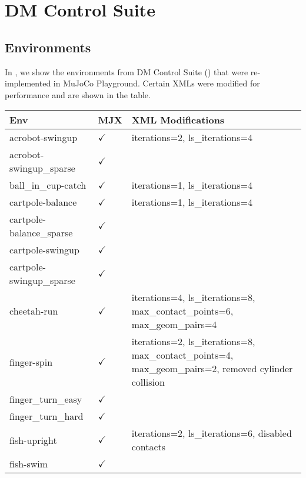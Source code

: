 \section{DM Control Suite}
\label{sec:appendix_dm_control}

\subsection{Environments}
\label{sec:appendix_dm_control_envs}

In , we show the environments from DM Control Suite (\cite{tassa2018deepmind}) that were re-implemented in MuJoCo Playground. Certain XMLs were modified for performance and are shown in the table. 

\begin{table*}[!ht]
\centering
\begin{tabular}{|l|p{1.2cm}|p{10cm}|} %
\hline
\textbf{Env} & \textbf{MJX} & \textbf{XML Modifications} \\ \hline
acrobot-swingup           & $\checkmark$ & iterations=2, ls\_iterations=4 \\ \hline
acrobot-swingup\_sparse    & $\checkmark$ &  \\ \hline
ball\_in\_cup-catch         & $\checkmark$ & iterations=1, ls\_iterations=4 \\ \hline
cartpole-balance          & $\checkmark$ & iterations=1, ls\_iterations=4 \\ \hline
cartpole-balance\_sparse   & $\checkmark$ &  \\ \hline
cartpole-swingup          & $\checkmark$ &  \\ \hline
cartpole-swingup\_sparse   & $\checkmark$ &  \\ \hline
cheetah-run               & $\checkmark$ & iterations=4, ls\_iterations=8, max\_contact\_points=6, max\_geom\_pairs=4 \\ \hline
finger-spin               & $\checkmark$ & iterations=2, ls\_iterations=8, max\_contact\_points=4, max\_geom\_pairs=2, removed cylinder collision \\ \hline
finger\_turn\_easy          & $\checkmark$ &  \\ \hline
finger\_turn\_hard          & $\checkmark$ &  \\ \hline
fish-upright              & $\checkmark$ & iterations=2, ls\_iterations=6, disabled contacts \\ \hline
fish-swim                 & $\checkmark$ &  \\ \hline

\end{tabular}
\end{table*}
